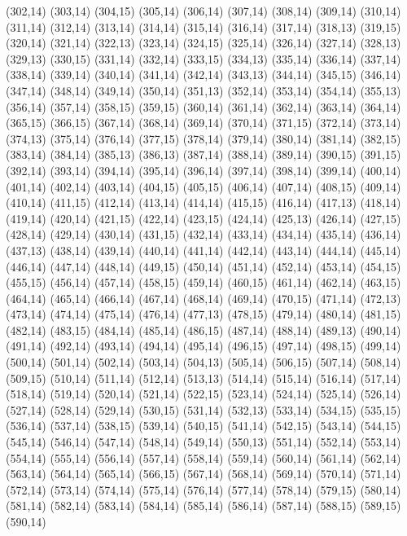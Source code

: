 (302,14)
(303,14)
(304,15)
(305,14)
(306,14)
(307,14)
(308,14)
(309,14)
(310,14)
(311,14)
(312,14)
(313,14)
(314,14)
(315,14)
(316,14)
(317,14)
(318,13)
(319,15)
(320,14)
(321,14)
(322,13)
(323,14)
(324,15)
(325,14)
(326,14)
(327,14)
(328,13)
(329,13)
(330,15)
(331,14)
(332,14)
(333,15)
(334,13)
(335,14)
(336,14)
(337,14)
(338,14)
(339,14)
(340,14)
(341,14)
(342,14)
(343,13)
(344,14)
(345,15)
(346,14)
(347,14)
(348,14)
(349,14)
(350,14)
(351,13)
(352,14)
(353,14)
(354,14)
(355,13)
(356,14)
(357,14)
(358,15)
(359,15)
(360,14)
(361,14)
(362,14)
(363,14)
(364,14)
(365,15)
(366,15)
(367,14)
(368,14)
(369,14)
(370,14)
(371,15)
(372,14)
(373,14)
(374,13)
(375,14)
(376,14)
(377,15)
(378,14)
(379,14)
(380,14)
(381,14)
(382,15)
(383,14)
(384,14)
(385,13)
(386,13)
(387,14)
(388,14)
(389,14)
(390,15)
(391,15)
(392,14)
(393,14)
(394,14)
(395,14)
(396,14)
(397,14)
(398,14)
(399,14)
(400,14)
(401,14)
(402,14)
(403,14)
(404,15)
(405,15)
(406,14)
(407,14)
(408,15)
(409,14)
(410,14)
(411,15)
(412,14)
(413,14)
(414,14)
(415,15)
(416,14)
(417,13)
(418,14)
(419,14)
(420,14)
(421,15)
(422,14)
(423,15)
(424,14)
(425,13)
(426,14)
(427,15)
(428,14)
(429,14)
(430,14)
(431,15)
(432,14)
(433,14)
(434,14)
(435,14)
(436,14)
(437,13)
(438,14)
(439,14)
(440,14)
(441,14)
(442,14)
(443,14)
(444,14)
(445,14)
(446,14)
(447,14)
(448,14)
(449,15)
(450,14)
(451,14)
(452,14)
(453,14)
(454,15)
(455,15)
(456,14)
(457,14)
(458,15)
(459,14)
(460,15)
(461,14)
(462,14)
(463,15)
(464,14)
(465,14)
(466,14)
(467,14)
(468,14)
(469,14)
(470,15)
(471,14)
(472,13)
(473,14)
(474,14)
(475,14)
(476,14)
(477,13)
(478,15)
(479,14)
(480,14)
(481,15)
(482,14)
(483,15)
(484,14)
(485,14)
(486,15)
(487,14)
(488,14)
(489,13)
(490,14)
(491,14)
(492,14)
(493,14)
(494,14)
(495,14)
(496,15)
(497,14)
(498,15)
(499,14)
(500,14)
(501,14)
(502,14)
(503,14)
(504,13)
(505,14)
(506,15)
(507,14)
(508,14)
(509,15)
(510,14)
(511,14)
(512,14)
(513,13)
(514,14)
(515,14)
(516,14)
(517,14)
(518,14)
(519,14)
(520,14)
(521,14)
(522,15)
(523,14)
(524,14)
(525,14)
(526,14)
(527,14)
(528,14)
(529,14)
(530,15)
(531,14)
(532,13)
(533,14)
(534,15)
(535,15)
(536,14)
(537,14)
(538,15)
(539,14)
(540,15)
(541,14)
(542,15)
(543,14)
(544,15)
(545,14)
(546,14)
(547,14)
(548,14)
(549,14)
(550,13)
(551,14)
(552,14)
(553,14)
(554,14)
(555,14)
(556,14)
(557,14)
(558,14)
(559,14)
(560,14)
(561,14)
(562,14)
(563,14)
(564,14)
(565,14)
(566,15)
(567,14)
(568,14)
(569,14)
(570,14)
(571,14)
(572,14)
(573,14)
(574,14)
(575,14)
(576,14)
(577,14)
(578,14)
(579,15)
(580,14)
(581,14)
(582,14)
(583,14)
(584,14)
(585,14)
(586,14)
(587,14)
(588,15)
(589,15)
(590,14)
